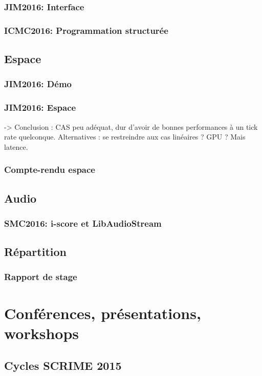 \documentclass[french,a4paper]{book}
\begin{document}
\subsubsection{JIM2016: Interface}
\subsubsection{ICMC2016: Programmation structurée}

\subsection{Espace}
\subsubsection{JIM2016: Démo}
\subsubsection{JIM2016: Espace}
-> Conclusion : CAS peu adéquat, dur d'avoir de bonnes performances à un tick rate quelconque.
Alternatives : se restreindre aux cas linéaires ? 
GPU ? Mais latence.


\subsubsection{Compte-rendu espace}

\subsection{Audio}
\subsubsection{SMC2016: i-score et LibAudioStream}

\subsection{Répartition}
\subsubsection{Rapport de stage}

\section{Conférences, présentations, workshops}
\subsection{Cycles SCRIME 2015}
\end{document}
